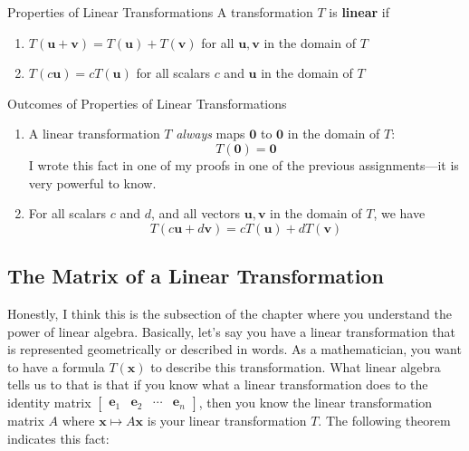 \documentclass{article}
\begin{document}
\begin{boxcontainer}{Properties of Linear Transformations}
	A transformation $T$ is \textbf{linear} if

	\begin{enumerate}[label=\alph*)]
		\item
		      $T(\mathbf{u} + \mathbf{v}) = T(\mathbf{u}) + T(\mathbf{v})$ for all $\mathbf{u}, \mathbf{v}$ in the domain of $T$
		\item
		      $T(c\mathbf{u}) = cT(\mathbf{u})$ for all scalars $c$ and $\mathbf{u}$ in the domain of $T$
	\end{enumerate}
\end{boxcontainer}

\begin{remark}{Outcomes of Properties of Linear Transformations}
	\begin{enumerate}[label=\alph*)]
		\item
		      A linear transformation $T$ \emph{always} maps $\mathbf{0}$ to $\mathbf{0}$ in the domain of $T$:
		      $$
			      T(\mathbf{0}) = \mathbf{0}
		      $$
		      I wrote this fact in one of my proofs in one of the previous assignments---it is very powerful to know.
		\item
		      For all scalars $c$ and $d$, and all vectors $\mathbf{u}, \mathbf{v}$ in the domain of $T$, we have
		      $$
			      T(c\mathbf{u} + d\mathbf{v}) = cT(\mathbf{u}) + dT(\mathbf{v})
		      $$
	\end{enumerate}
\end{remark}

\subsection{The Matrix of a Linear Transformation}
Honestly, I think this is the subsection of the chapter where you understand the power of linear algebra. Basically, let's say you have a linear transformation that is represented geometrically or described in words. As a mathematician, you want to have a formula $T(\mathbf{x})$ to describe this transformation. What linear algebra tells us to that is that if you know what a linear transformation does to the identity matrix $\begin{bmatrix} \mathbf{e}_1 & \mathbf{e}_2 & \cdots & \mathbf{e}_n \end{bmatrix}$, then you know the linear transformation matrix $A$ where $\mathbf{x} \mapsto A\mathbf{x}$ is your linear transformation $T$. The following theorem indicates this fact:
\end{document}
